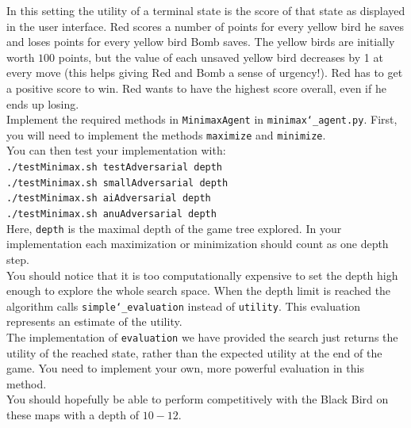 \documentclass[12pt]{article}
\begin{document}
In this setting the utility of a terminal state is the score of that state as displayed in
the user interface. 
Red scores a number of points for every yellow bird he saves and loses
points for every yellow bird Bomb saves. The yellow birds are
initially worth $100$ points, but the value of each unsaved yellow
bird decreases by 1 at every move (this helps giving Red and Bomb a
sense of urgency!).  Red has to get a positive score to win. Red wants
to have the highest score overall, even if he ends up losing.\\

Implement the required methods in \texttt{MinimaxAgent} in \texttt{minimax\char`_agent.py}.
First, you will need to implement the methods \texttt{maximize} and \texttt{minimize}.\\

You can then test your implementation with:\\

\texttt{./testMinimax.sh testAdversarial depth}\\
\indent\texttt{./testMinimax.sh smallAdversarial depth}\\
\indent\texttt{./testMinimax.sh aiAdversarial depth}\\
\indent\texttt{./testMinimax.sh anuAdversarial depth}\\

Here, \texttt{depth} is the maximal depth of the game tree explored.
In your implementation
each maximization or minimization should count as one depth step.\\

You should notice that it is too computationally expensive to set the depth high enough to explore
the whole search space. When the depth limit is reached the algorithm calls
\texttt{simple\char`_evaluation} instead of \texttt{utility}. This evaluation represents
an estimate of the utility.\\

The implementation of \texttt{evaluation} we have provided the search just returns
the utility of the reached state, rather than the expected utility at the end of the game.
You need to implement your own, more powerful evaluation in this method.\\

You should hopefully be able to perform competitively with the Black Bird on these maps
with a depth of $10-12$.\\
\end{document}
